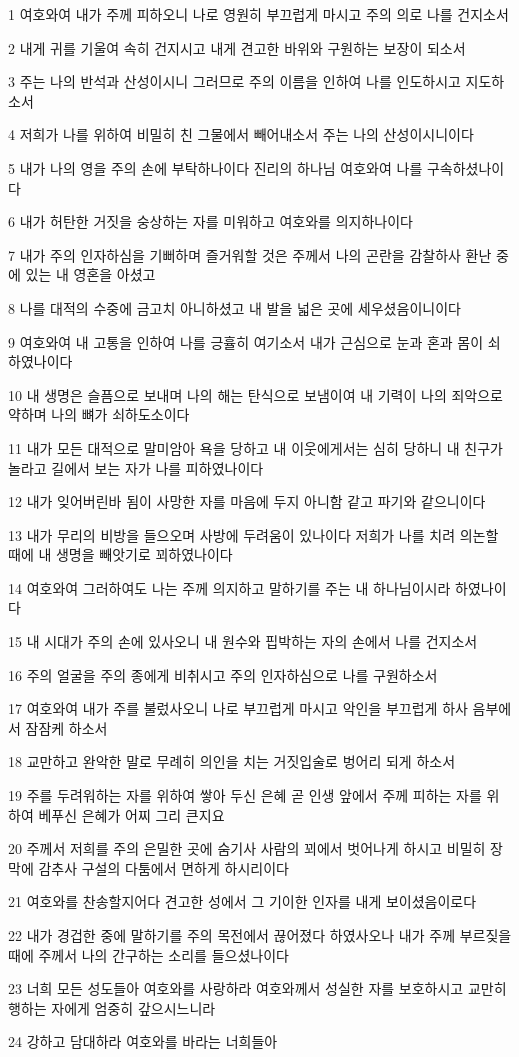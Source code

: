 \par 1 여호와여 내가 주께 피하오니 나로 영원히 부끄럽게 마시고 주의 의로 나를 건지소서
\par 2 내게 귀를 기울여 속히 건지시고 내게 견고한 바위와 구원하는 보장이 되소서
\par 3 주는 나의 반석과 산성이시니 그러므로 주의 이름을 인하여 나를 인도하시고 지도하소서
\par 4 저희가 나를 위하여 비밀히 친 그물에서 빼어내소서 주는 나의 산성이시니이다
\par 5 내가 나의 영을 주의 손에 부탁하나이다 진리의 하나님 여호와여 나를 구속하셨나이다
\par 6 내가 허탄한 거짓을 숭상하는 자를 미워하고 여호와를 의지하나이다
\par 7 내가 주의 인자하심을 기뻐하며 즐거워할 것은 주께서 나의 곤란을 감찰하사 환난 중에 있는 내 영혼을 아셨고
\par 8 나를 대적의 수중에 금고치 아니하셨고 내 발을 넓은 곳에 세우셨음이니이다
\par 9 여호와여 내 고통을 인하여 나를 긍휼히 여기소서 내가 근심으로 눈과 혼과 몸이 쇠하였나이다
\par 10 내 생명은 슬픔으로 보내며 나의 해는 탄식으로 보냄이여 내 기력이 나의 죄악으로 약하며 나의 뼈가 쇠하도소이다
\par 11 내가 모든 대적으로 말미암아 욕을 당하고 내 이웃에게서는 심히 당하니 내 친구가 놀라고 길에서 보는 자가 나를 피하였나이다
\par 12 내가 잊어버린바 됨이 사망한 자를 마음에 두지 아니함 같고 파기와 같으니이다
\par 13 내가 무리의 비방을 들으오며 사방에 두려움이 있나이다 저희가 나를 치려 의논할 때에 내 생명을 빼앗기로 꾀하였나이다
\par 14 여호와여 그러하여도 나는 주께 의지하고 말하기를 주는 내 하나님이시라 하였나이다
\par 15 내 시대가 주의 손에 있사오니 내 원수와 핍박하는 자의 손에서 나를 건지소서
\par 16 주의 얼굴을 주의 종에게 비취시고 주의 인자하심으로 나를 구원하소서
\par 17 여호와여 내가 주를 불렀사오니 나로 부끄럽게 마시고 악인을 부끄럽게 하사 음부에서 잠잠케 하소서
\par 18 교만하고 완악한 말로 무례히 의인을 치는 거짓입술로 벙어리 되게 하소서
\par 19 주를 두려워하는 자를 위하여 쌓아 두신 은혜 곧 인생 앞에서 주께 피하는 자를 위하여 베푸신 은혜가 어찌 그리 큰지요
\par 20 주께서 저희를 주의 은밀한 곳에 숨기사 사람의 꾀에서 벗어나게 하시고 비밀히 장막에 감추사 구설의 다툼에서 면하게 하시리이다
\par 21 여호와를 찬송할지어다 견고한 성에서 그 기이한 인자를 내게 보이셨음이로다
\par 22 내가 경겁한 중에 말하기를 주의 목전에서 끊어졌다 하였사오나 내가 주께 부르짖을 때에 주께서 나의 간구하는 소리를 들으셨나이다
\par 23 너희 모든 성도들아 여호와를 사랑하라 여호와께서 성실한 자를 보호하시고 교만히 행하는 자에게 엄중히 갚으시느니라
\par 24 강하고 담대하라 여호와를 바라는 너희들아

